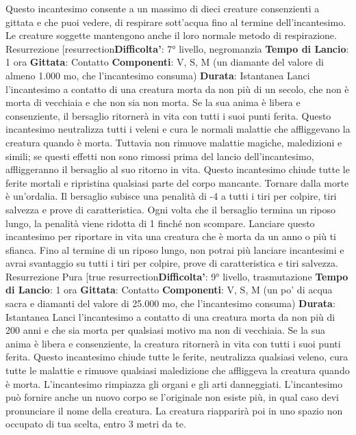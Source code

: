 \begin{multicols}{2}
Questo incantesimo consente a un massimo di dieci
creature consenzienti a gittata e che puoi vedere, di
respirare sott’acqua fino al termine dell’incantesimo. Le
creature soggette mantengono anche il loro normale
metodo di respirazione.
Resurrezione
[resurrection\textbf{Difficolta'}:
7° livello, negromanzia
\textbf{Tempo di Lancio}: 1 ora
\textbf{Gittata}: Contatto
\textbf{Componenti}: V, S, M (un diamante del valore di
almeno 1.000 mo, che l’incantesimo consuma)
\textbf{Durata}: Istantanea
Lanci l’incantesimo a contatto di una creatura morta da
non più di un secolo, che non è morta di vecchiaia e
che non sia non morta. Se la sua anima è libera e
consenziente, il bersaglio ritornerà in vita con tutti i suoi
punti ferita.
Questo incantesimo neutralizza tutti i veleni e cura le
normali malattie che affliggevano la creatura quando è
morta. Tuttavia non rimuove malattie magiche,
maledizioni e simili; se questi effetti non sono rimossi
prima del lancio dell’incantesimo, affliggeranno il
bersaglio al suo ritorno in vita.
Questo incantesimo chiude tutte le ferite mortali e
ripristina qualsiasi parte del corpo mancante.
Tornare dalla morte è un’ordalia. Il bersaglio subisce
una penalità di -4 a tutti i tiri per colpire, tiri salvezza e
prove di caratteristica. Ogni volta che il bersaglio
termina un riposo lungo, la penalità viene ridotta di 1
finché non scompare.
Lanciare questo incantesimo per riportare in vita una
creatura che è morta da un anno o più ti sfianca. Fino al
termine di un riposo lungo, non potrai più lanciare
incantesimi e avrai svantaggio su tutti i tiri per colpire,
prove di caratteristica e tiri salvezza.
Resurrezione Pura
[true resurrection\textbf{Difficolta'}:
9° livello, trasmutazione
\textbf{Tempo di Lancio}: 1 ora
\textbf{Gittata}: Contatto
\textbf{Componenti}: V, S, M (un po’ di acqua sacra e diamanti
del valore di 25.000 mo, che l’incantesimo consuma)
\textbf{Durata}: Istantanea
Lanci l’incantesimo a contatto di una creatura morta da
non più di 200 anni e che sia morta per qualsiasi motivo
ma non di vecchiaia. Se la sua anima è libera e
consenziente, la creatura ritornerà in vita con tutti i suoi
punti ferita.
Questo incantesimo chiude tutte le ferite, neutralizza
qualsiasi veleno, cura tutte le malattie e rimuove
qualsiasi maledizione che affliggeva la creatura quando
è morta. L’incantesimo rimpiazza gli organi e gli arti
danneggiati.
L’incantesimo può fornire anche un nuovo corpo se
l’originale non esiste più, in qual caso devi pronunciare
il nome della creatura. La creatura riapparirà poi in uno
spazio non occupato di tua scelta, entro 3 metri da te.

\end{multicols}
